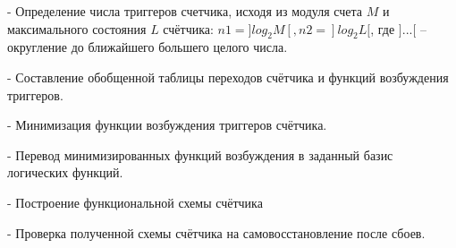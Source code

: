 \noindent - Определение числа триггеров счетчика, исходя из модуля счета $M$ и максимального состояния $L$ счётчика: $n1 = ]log_{2}M[, n2 = ]log_{2}L[$, где $]...[$ -- округление до ближайшего большего целого числа.

\noindent - Составление обобщенной таблицы переходов счётчика и функций возбуждения триггеров.

\noindent - Минимизация функции возбуждения триггеров счётчика.

\noindent - Перевод минимизированных функций возбуждения в заданный базис логических функций.

\noindent - Построение функциональной схемы счётчика

\noindent - Проверка полученной схемы счётчика на самовосстановление после сбоев.
